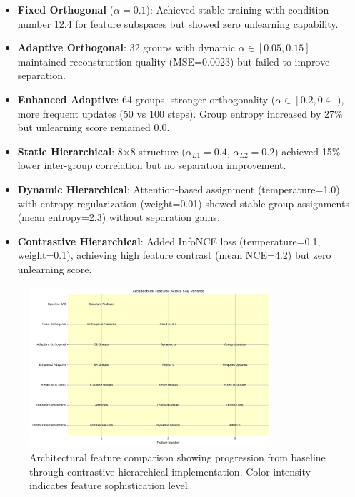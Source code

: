 \documentclass{article} %
\begin{document}
\begin{itemize}
    \item \textbf{Fixed Orthogonal} ($\alpha=0.1$): Achieved stable training with condition number 12.4 for feature subspaces but showed zero unlearning capability.
    
    \item \textbf{Adaptive Orthogonal}: 32 groups with dynamic $\alpha \in [0.05, 0.15]$ maintained reconstruction quality (MSE=0.0023) but failed to improve separation.
    
    \item \textbf{Enhanced Adaptive}: 64 groups, stronger orthogonality ($\alpha \in [0.2, 0.4]$), more frequent updates (50 vs 100 steps). Group entropy increased by 27\% but unlearning score remained 0.0.
    
    \item \textbf{Static Hierarchical}: 8$\times$8 structure ($\alpha_{L1}=0.4$, $\alpha_{L2}=0.2$) achieved 15\% lower inter-group correlation but no separation improvement.
    
    \item \textbf{Dynamic Hierarchical}: Attention-based assignment (temperature=1.0) with entropy regularization (weight=0.01) showed stable group assignments (mean entropy=2.3) without separation gains.
    
    \item \textbf{Contrastive Hierarchical}: Added InfoNCE loss (temperature=0.1, weight=0.1), achieving high feature contrast (mean NCE=4.2) but zero unlearning score.
\end{itemize}

\begin{figure}[h]
    \centering
    \includegraphics[width=0.8\textwidth]{architecture_comparison.png}
    \caption{Architectural feature comparison showing progression from baseline through contrastive hierarchical implementation. Color intensity indicates feature sophistication level.}
    \label{fig:arch_comparison}
\end{figure}
\end{document}
